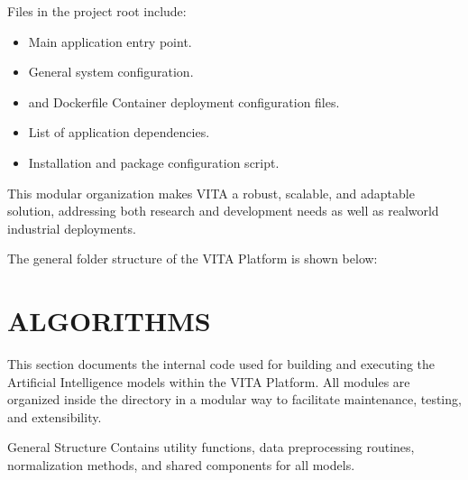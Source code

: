 \documentclass[letterpaper,10pt,english]{sphinxmanual}
\begin{document}
\sphinxAtStartPar
Files in the project root include:
\begin{itemize}
\item {} 
\sphinxAtStartPar
{} \textendash{} Main application entry point.

\item {} 
\sphinxAtStartPar
{} \textendash{} General system configuration.

\item {} 
\sphinxAtStartPar
{} and Dockerfile \textendash{} Container deployment configuration files.

\item {} 
\sphinxAtStartPar
{} \textendash{} List of application dependencies.

\item {} 
\sphinxAtStartPar
{} \textendash{} Installation and package configuration script.

\end{itemize}

\sphinxAtStartPar
This modular organization makes VITA a robust, scalable, and adaptable solution, addressing both research and development needs as well as real\sphinxhyphen{}world industrial deployments.

\sphinxAtStartPar
The general folder structure of the VITA Platform is shown below:


\sphinxstepscope


\section{ALGORITHMS}
\label{\detokenize{algorithms:algorithms}}\label{\detokenize{algorithms::doc}}
\sphinxAtStartPar
This section documents the internal code used for building and executing the Artificial Intelligence models within the VITA Platform.
All modules are organized inside the  directory in a modular way to facilitate maintenance, testing, and extensibility.

\sphinxAtStartPar
General Structure
 \textendash{} Contains utility functions, data preprocessing routines, normalization methods, and shared components for all models.
\end{document}
